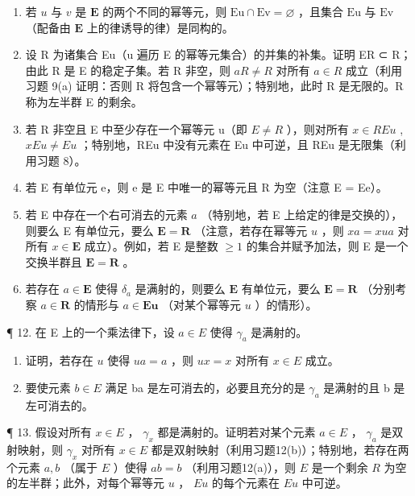 \begin{enumerate}
\def\labelenumi{(\alph{enumi})}
\setcounter{enumi}{1}
\item
  若 \(u\) 与 \(v\) 是 \(\mathbf{E}\) 的两个不同的幂等元，则 \(\mathrm{Eu} \cap \mathrm{Ev} = \varnothing\) ，且集合 \(\mathrm{Eu}\) 与 \(\mathrm{Ev}\) （配备由 \(\mathbf{E}\) 上的律诱导的律）是同构的。
\item
  设 R 为诸集合 Eu（u 遍历 E 的幂等元集合）的并集的补集。证明 ER ⊂ R；由此 R 是 E 的稳定子集。若 R 非空，则 \(aR \neq R\) 对所有 \(a \in R\) 成立（利用习题 9(a) 证明：否则 R 将包含一个幂等元）；特别地，此时 R 是无限的。R 称为左半群 E 的剩余。
\item
  若 R 非空且 E 中至少存在一个幂等元 u（即 \(E \neq R\) ），则对所有 \(x \in REu\) , \(xEu \neq Eu\) ；特别地，REu 中没有元素在 Eu 中可逆，且 REu 是无限集（利用习题 8）。
\item
  若 E 有单位元 e，则 e 是 E 中唯一的幂等元且 R 为空（注意 E = Ee）。
\item
  若 E 中存在一个右可消去的元素 \(a\) （特别地，若 E 上给定的律是交换的），则要么 E 有单位元，要么 \(\mathbf{E} = \mathbf{R}\) （注意，若存在幂等元 \(u\) ，则 \(xa = xua\) 对所有 \(x \in \mathbf{E}\) 成立）。例如，若 E 是整数 \(\geqslant 1\) 的集合并赋予加法，则 E 是一个交换半群且 \(\mathbf{E} = \mathbf{R}\) 。
\item
  若存在 \(a \in \mathbf{E}\) 使得 \(\delta_a\) 是满射的，则要么 \(\mathbf{E}\) 有单位元，要么 \(\mathbf{E} = \mathbf{R}\) （分别考察 \(a \in \mathbf{R}\) 的情形与 \(a \in \mathbf{Eu}\) （对某个幂等元 \(u\) ）的情形）。
\end{enumerate}

¶ 12. 在 E 上的一个乘法律下，设 \(a \in E\) 使得 \(\gamma_{a}\) 是满射的。

\begin{enumerate}
\def\labelenumi{(\alph{enumi})}
\item
  证明，若存在 \(u\) 使得 \(ua = a\) ，则 \(ux = x\) 对所有 \(x \in E\) 成立。
\item
  要使元素 \(b \in E\) 满足 ba 是左可消去的，必要且充分的是 \(\gamma_{a}\) 是满射的且 b 是左可消去的。
\end{enumerate}

¶ 13. 假设对所有 \(x \in E\) ， \(\gamma_x\) 都是满射的。证明若对某个元素 \(a \in E\) ， \(\gamma_a\) 是双射映射，则 \(\gamma_x\) 对所有 \(x \in E\) 都是双射映射（利用习题12(b)）；特别地，若存在两个元素 \(a, b\) （属于 \(E\) ）使得 \(ab = b\) （利用习题12(a)），则 \(E\) 是一个剩余 \(R\) 为空的左半群；此外，对每个幂等元 \(u\) ， \(Eu\) 的每个元素在 \(Eu\) 中可逆。

